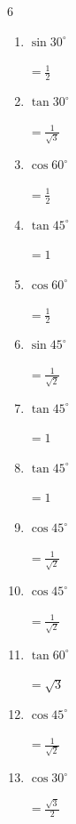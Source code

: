 \begin{multicols}{6}
\begin{enumerate}
        $\displaystyle =\sqrt{3}$

  \item $\displaystyle \sin{30^\circ}$

        $\displaystyle =\frac{1}{2}$

  \item $\displaystyle \tan{30^\circ}$

        $\displaystyle =\frac{1}{\sqrt{3}}$

  \item $\displaystyle \cos{60^\circ}$

        $\displaystyle =\frac{1}{2}$

  \item $\displaystyle \tan{45^\circ}$

        $\displaystyle =1$

  \item $\displaystyle \cos{60^\circ}$

        $\displaystyle =\frac{1}{2}$

  \item $\displaystyle \sin{45^\circ}$

        $\displaystyle =\frac{1}{\sqrt{2}}$

  \item $\displaystyle \tan{45^\circ}$

        $\displaystyle =1$

  \item $\displaystyle \tan{45^\circ}$

        $\displaystyle =1$

  \item $\displaystyle \cos{45^\circ}$

        $\displaystyle =\frac{1}{\sqrt{2}}$

  \item $\displaystyle \cos{45^\circ}$

        $\displaystyle =\frac{1}{\sqrt{2}}$

  \item $\displaystyle \tan{60^\circ}$

        $\displaystyle =\sqrt{3}$

  \item $\displaystyle \cos{45^\circ}$

        $\displaystyle =\frac{1}{\sqrt{2}}$

  \item $\displaystyle \cos{30^\circ}$

        $\displaystyle =\frac{\sqrt{3}}{2}$


\end{enumerate}
\end{multicols}
